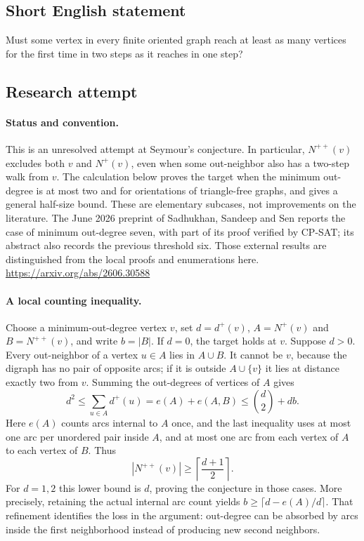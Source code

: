 \documentclass[11pt,a4paper]{article}
\begin{document}
\subsection{Short English statement}

Must some vertex in every finite oriented graph reach at least as many vertices for the first time in two steps as it reaches in one step?

\subsection{Research attempt}
\paragraph{Status and convention.}
This is an unresolved attempt at Seymour's conjecture. In particular,
$N^{++}(v)$ excludes both $v$ and $N^+(v)$, even when some out-neighbor
also has a two-step walk from $v$. The calculation below proves the
target when the minimum out-degree is at most two and for orientations
of triangle-free graphs, and gives a general half-size bound. These
are elementary subcases, not improvements on the literature.
The June 2026 preprint of Sadhukhan, Sandeep and Sen reports the case
of minimum out-degree seven, with part of its proof verified by CP-SAT;
its abstract also records the previous threshold six. Those external
results are distinguished from the local proofs and enumerations here.
\url{https://arxiv.org/abs/2606.30588}

\paragraph{A local counting inequality.}
Choose a minimum-out-degree vertex $v$, set $d=d^+(v)$,
$A=N^+(v)$ and $B=N^{++}(v)$, and write $b=|B|$. If $d=0$, the target
holds at $v$. Suppose $d>0$. Every out-neighbor of a vertex $u\in A$
lies in $A\cup B$. It cannot be $v$, because the digraph has no pair
of opposite arcs; if it is outside $A\cup\{v\}$ it lies at distance
exactly two from $v$. Summing the out-degrees of vertices of $A$ gives
\[
 d^2\leq\sum_{u\in A}d^+(u)=e(A)+e(A,B)
       \leq\binom d2+db.
\]
Here $e(A)$ counts arcs internal to $A$ once, and the last inequality
uses at most one arc per unordered pair inside $A$, and at most one
arc from each vertex of $A$ to each vertex of $B$. Thus
\[
 |N^{++}(v)|\geq\left\lceil\frac{d+1}{2}\right\rceil.
\]
For $d=1,2$ this lower bound is $d$, proving the conjecture in those
cases. More precisely, retaining the actual internal arc count yields
$b\geq\lceil d-e(A)/d\rceil$. That refinement identifies the loss in
the argument: out-degree can be absorbed by arcs inside the first
neighborhood instead of producing new second neighbors.
\end{document}
